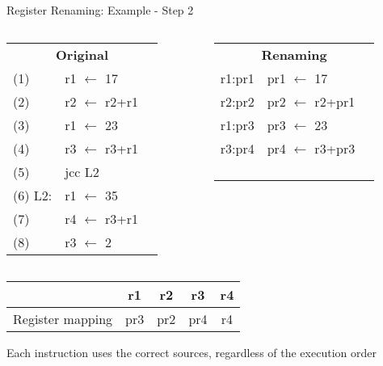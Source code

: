 \documentclass[aspectratio=169,12pt]{beamer}
\begin{document}
\begin{frame}{Register Renaming: Example - Step 2}
  \begin{columns}
    \begin{column}{0.5\textwidth}
      \begin{tabular}{lll}
        \multicolumn{3}{c}{\textbf{Original}} \\
        (1) & r1 $\leftarrow$ 17 & \\
        (2) & r2 $\leftarrow$ r2+r1 & \\
        (3) & r1 $\leftarrow$ 23 & \\
        (4) & r3 $\leftarrow$ r3+r1 & \\
        (5) & jcc L2 & \\
        (6) L2: & r1 $\leftarrow$ 35 & \\
        (7) & r4 $\leftarrow$ r3+r1 & \\
        (8) & r3 $\leftarrow$ 2 & \\
      \end{tabular}
    \end{column}

    \begin{column}{0.5\textwidth}
      \begin{tabular}{lll}
        \multicolumn{3}{c}{\textbf{Renaming}} \\
        r1:pr1 & pr1 $\leftarrow$ 17 & \\
        r2:pr2 & pr2 $\leftarrow$ r2+pr1 & \\
        r1:pr3 & pr3 $\leftarrow$ 23 & \\
        r3:pr4 & pr4 $\leftarrow$ r3+pr3 & \\
        & & \\
        & & \\
        & & \\
        & & \\
      \end{tabular}
    \end{column}
  \end{columns}

  \vspace{0.5cm}
  \begin{center}
    \begin{tabular}{|c|c|c|c|c|}
      \hline
      & r1 & r2 & r3 & r4 \\
      \hline
      Register mapping & pr3 & pr2 & pr4 & r4 \\
      \hline
    \end{tabular}
  \end{center}

  \begin{center}
    \colorbox{green!30}{Each instruction uses the correct sources, regardless of the execution order}
  \end{center}
\end{frame}
\end{document}
